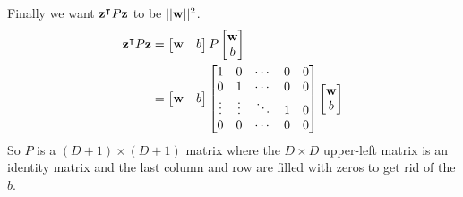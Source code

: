 {	Finally we want ${\mathbf{z}}^\intercal P {\mathbf{z}}$ to be $||{\mathbf{w}}||^2$. 
	\begin{align*}
		{\mathbf{z}}^\intercal P {\mathbf{z}} &= 
			\begin{bmatrix}
				{\mathbf{w}} & b
			\end{bmatrix}
			P
			\begin{bmatrix}
				{\mathbf{w}}\\
				b
			\end{bmatrix}\\
		&= \begin{bmatrix}
				{\mathbf{w}} & b
			\end{bmatrix}
			\begin{bmatrix}
				1 & 0 & \cdots & 0 & 0\\
				0 & 1 & \cdots & 0 & 0\\
				\vdots & \vdots & \ddots & 1 & 0\\
				0 & 0 & \cdots & 0 & 0
			\end{bmatrix}
			\begin{bmatrix}
				{\mathbf{w}}\\
				b
			\end{bmatrix}
	\end{align*}
	So $P$ is a $(D+1)\times(D+1)$ matrix where the $D \times D$ upper-left matrix is an identity matrix and the last column and row are filled with zeros to get rid of the $b$.
}

\newcommand{\spEighteenSvmOneD}{
	When $C = \infty$ we are making the second term (the cost of the slack variables) to prevail over $\bf{w}$ so the minimization process will need to minimize the $\xi^{(i)}$. This means that it will try to find a separation that perfectly classifies all the data.\\
	
	When $C=0$ we are saying that we don't care about the slack variables at all. They can be anything so there may be many mis-classifications. Note that this is equivalent to hard-SVM because minimizing $||\bf{w}||$ is the same as maximizing the margin $\left(\frac{2}{||\bf{w}||}\right)$.
}

\newcommand{\spEighteenSvmOneE}{

}

\newcommand{\spEighteenSvmOneF}{

}


